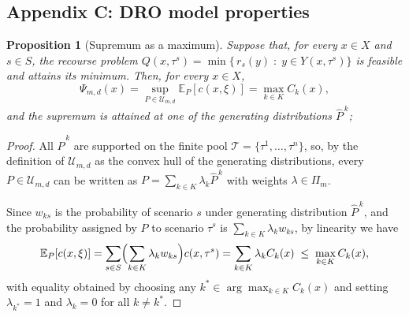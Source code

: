 \documentclass[mnsc,sglanonrev]{informs4}  %
\newtheorem{proposition}{Proposition}
\theoremstyle{remark}\newtheorem{remark}{Remark}
\begin{document}
\begin{APPENDICES}
\section{Appendix C: DRO model properties} \label{app:proofs}


\begin{proposition}[Supremum as a maximum]\label{prop:supmax}
Suppose that, for every $x\in X$ and $s\in S$, the recourse problem $Q(x,\tau^s)=\min\bigl\{\,r_s(y)\;:\;y\in Y(x,\tau^s)\bigr\}$
is feasible and attains its minimum. Then, for every $x\in X$,
\[ \Psi_{m,d}(x)=\sup_{P\in\mathcal U_{m,d}}\mathbb E_P[c(x,\xi)]=\max_{k\in K}C_k(x), \]
and the supremum is attained at one of the generating distributions $\widehat P^{\,k}$;
\end{proposition}

\begin{proof}
All $\widehat P^{\,k}$ are supported on the finite pool $\mathcal T=\{\tau^1,\ldots,\tau^n\}$, so, by the definition of \(\mathcal U_{m,d}\) as the convex hull of the generating distributions, every \(P\in\mathcal U_{m,d}\) can be written as $P=\sum_{k\in K}\lambda_k\widehat P^{\,k}$ with weights $\lambda\in\Pi_m$. 

Since \(w_{ks}\) is the probability of scenario \(s\) under generating distribution \(\widehat P^{\,k}\), and the probability assigned by \(P\) to scenario \(\tau^s\) is \(\sum_{k\in K}\lambda_k w_{ks}\), by linearity we have
\[
\mathbb E_P[c(x,\xi)]
=\sum_{s\in S}\Bigl(\sum_{k\in K}\lambda_k w_{ks}\Bigr)c(x,\tau^s)
=\sum_{k\in K}\lambda_k C_k(x) \; \le \; \max_{k\in K}C_k(x),
\]
with equality obtained by choosing any $k^*\in\arg\max_{k\in K}C_k(x)$ and setting $\lambda_{k^*}=1$ and $\lambda_k=0$ for all $k\ne k^*$.


\end{proof}
\end{APPENDICES}
\end{document}
